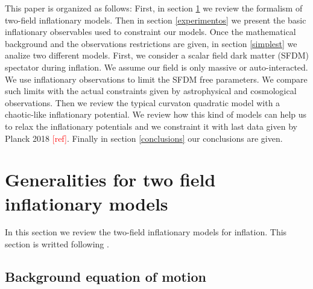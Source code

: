 \documentclass[amssymb,twocolumn,prd,nofootinbib,showpacs]{revtex4-1}
\begin{document}
This paper is organized as follows: First, in section \ref{Generalities} we review the formalism of two-field inflationary models. Then in section \ref{experimentos} we present the basic inflationary observables used to constraint our models. Once the mathematical background and the observations restrictions are given, in section \ref{simplest} we analize two different models. First, we consider a scalar field dark matter (SFDM) spectator during inflation. We assume our field is only massive or auto-interacted. We use inflationary observations to limit the SFDM free parameters. We compare such limits with the actual constraints given by astrophysical and cosmological observations. Then we review the typical curvaton quadratic model with a chaotic-like inflationary potential. We review how this kind of models can help us to relax the inflationary potentials and we constraint it with last data given by Planck 2018 \textcolor{red}{[ref]}. Finally in section \ref{conclusions} our conclusions are given.      

\section{Generalities for two field inflationary models}\label{Generalities}

In this section we review the two-field inflationary models for inflation. This section is writted following \cite{twofields}. 

\subsection{Background equation of motion}
\end{document}

